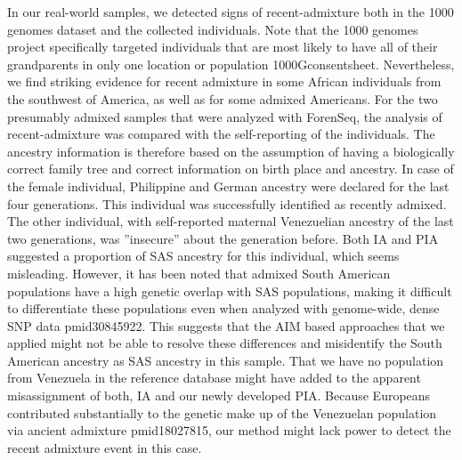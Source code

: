 \documentclass[12pt]{article}
\theoremstyle{definition}
\begin{document}
In our real-world samples, we detected signs of recent-admixture both in the 1000 genomes dataset and the {\color{blue} collected} individuals. Note that the 1000 genomes project specifically targeted individuals that are most likely to have all of their grandparents in only one location or population \cite{article}{1000Gconsentsheet}. Nevertheless, we find striking evidence for recent admixture in some African individuals from the southwest of America{\color{blue}, as well as for some admixed Americans}. For the two presumably admixed samples that were analyzed with ForenSeq, the analysis of recent-admixture was compared with the self-reporting of the individuals. The ancestry information is therefore based on the assumption of having a biologically correct family tree and correct information on birth place and ancestry. In case of the female individual, Philippine and German ancestry were declared for the last four generations. This individual was successfully identified as recently admixed. The other individual, with self-reported maternal Venezuelian ancestry of the last two generations, was ”insecure” about the generation before. {\color{blue}Both IA and PIA suggested a proportion of SAS ancestry for this individual, which seems misleading. However, it has been noted that admixed South American populations have a high genetic overlap with SAS populations, making it difficult to differentiate these populations even when analyzed with genome-wide, dense SNP data \cite{article}{pmid30845922}. This suggests that the AIM based approaches that we applied might not be able to resolve these differences and misidentify the South American ancestry as SAS ancestry in this sample. That we have no population from Venezuela in the reference database might have added to the apparent misassignment of both, IA and our newly developed PIA. Because Europeans contributed substantially to the genetic make up of the Venezuelan population via ancient admixture \cite{article}{pmid18027815}, our method might lack power to detect the recent admixture event in this case.}


\end{document}
